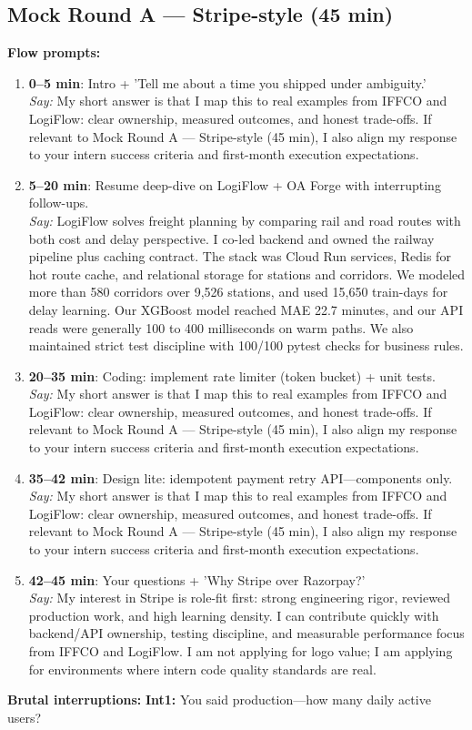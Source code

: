 \documentclass[9pt,a4paper]{article}
\begin{document}
\subsection{Mock Round A --- Stripe-style (45 min)}
\textbf{Flow prompts:}
\begin{enumerate}
  \item \textbf{0--5 min}: Intro + 'Tell me about a time you shipped under ambiguity.'\\
  \textit{Say:} My short answer is that I map this to real examples from IFFCO and LogiFlow: clear ownership, measured outcomes, and honest trade-offs. If relevant to Mock Round A --- Stripe-style (45 min), I also align my response to your intern success criteria and first-month execution expectations.
  \item \textbf{5--20 min}: Resume deep-dive on LogiFlow + OA Forge with interrupting follow-ups.\\
  \textit{Say:} LogiFlow solves freight planning by comparing rail and road routes with both cost and delay perspective. I co-led backend and owned the railway pipeline plus caching contract. The stack was Cloud Run services, Redis for hot route cache, and relational storage for stations and corridors. We modeled more than 580 corridors over 9,526 stations, and used 15,650 train-days for delay learning. Our XGBoost model reached MAE 22.7 minutes, and our API reads were generally 100 to 400 milliseconds on warm paths. We also maintained strict test discipline with 100/100 pytest checks for business rules.
  \item \textbf{20--35 min}: Coding: implement rate limiter (token bucket) + unit tests.\\
  \textit{Say:} My short answer is that I map this to real examples from IFFCO and LogiFlow: clear ownership, measured outcomes, and honest trade-offs. If relevant to Mock Round A --- Stripe-style (45 min), I also align my response to your intern success criteria and first-month execution expectations.
  \item \textbf{35--42 min}: Design lite: idempotent payment retry API---components only.\\
  \textit{Say:} My short answer is that I map this to real examples from IFFCO and LogiFlow: clear ownership, measured outcomes, and honest trade-offs. If relevant to Mock Round A --- Stripe-style (45 min), I also align my response to your intern success criteria and first-month execution expectations.
  \item \textbf{42--45 min}: Your questions + 'Why Stripe over Razorpay?'\\
  \textit{Say:} My interest in Stripe is role-fit first: strong engineering rigor, reviewed production work, and high learning density. I can contribute quickly with backend/API ownership, testing discipline, and measurable performance focus from IFFCO and LogiFlow. I am not applying for logo value; I am applying for environments where intern code quality standards are real.
\end{enumerate}
\textbf{Brutal interruptions:}
\textbf{Int1:} You said production---how many daily active users?
\end{document}
